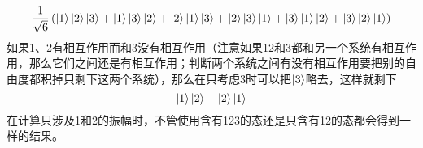 \documentclass[hyperref, UTF8, a4paper]{ctexart}
\begin{document}

\[
    \frac{1}{\sqrt{6}} \left( \ket{1}\ket{2}\ket{3} + \ket{1}\ket{3}\ket{2} + \ket{2}\ket{1}\ket{3} + \ket{2}\ket{3}\ket{1} + \ket{3}\ket{1}\ket{2} + \ket{3}\ket{2}\ket{1}
    \right)
\]
如果1、2有相互作用而和3没有相互作用（注意如果12和3都和另一个系统有相互作用，那么它们之间还是有相互作用；判断两个系统之间有没有相互作用要把别的自由度都积掉只剩下这两个系统），那么在只考虑3时可以把$\ket{3}$略去，这样就剩下
\[
    \ket{1}\ket{2} + \ket{2}\ket{1}
\]
在计算只涉及1和2的振幅时，不管使用含有123的态还是只含有12的态都会得到一样的结果。
\end{document}

